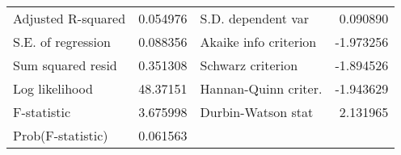 \begin{tabular}{lrrrr}
\multicolumn{1}{l}{Adjusted R-squared}&\multicolumn{1}{r}{0.054976}&\multicolumn{2}{l}{S.D. dependent var}&\multicolumn{1}{r}{0.090890}\\
\multicolumn{1}{l}{S.E. of regression}&\multicolumn{1}{r}{0.088356}&\multicolumn{2}{l}{Akaike info criterion}&\multicolumn{1}{r}{-1.973256}\\
\multicolumn{1}{l}{Sum squared resid}&\multicolumn{1}{r}{0.351308}&\multicolumn{2}{l}{Schwarz criterion}&\multicolumn{1}{r}{-1.894526}\\
\multicolumn{1}{l}{Log likelihood}&\multicolumn{1}{r}{48.37151}&\multicolumn{2}{l}{Hannan-Quinn criter.}&\multicolumn{1}{r}{-1.943629}\\
\multicolumn{1}{l}{F-statistic}&\multicolumn{1}{r}{3.675998}&\multicolumn{2}{l}{Durbin-Watson stat}&\multicolumn{1}{r}{2.131965}\\
\multicolumn{1}{l}{Prob(F-statistic)}&\multicolumn{1}{r}{0.061563}&\multicolumn{1}{c}{}&\multicolumn{1}{c}{}&\multicolumn{1}{c}{}\\
\bottomrule
\end{tabular}
